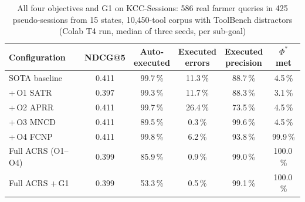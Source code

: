 \begin{table}[htbp]
  \centering
  \caption{All four objectives and G1 on KCC-Sessions: 586 real farmer queries in 425 pseudo-sessions from 15 states, 10{,}450-tool corpus with ToolBench distractors (Colab T4 run, median of three seeds, per sub-goal)}
  \label{tab:gkcc-ablation}
  \footnotesize\setlength{\tabcolsep}{4pt}
  \begin{tabular}{@{}lccccc@{}}
    \toprule
    Configuration & NDCG@5 & \makecell{Auto-\\executed} & \makecell{Executed\\errors} & \makecell{Executed\\precision} & \makecell{$\Phi^\ast$\\met} \\
    \midrule
    SOTA baseline & 0.411 & 99.7\,\% & 11.3\,\% & 88.7\,\% & 4.5\,\% \\
    +\,O1 SATR & 0.397 & 99.3\,\% & 11.7\,\% & 88.3\,\% & 3.1\,\% \\
    +\,O2 APRR & 0.411 & 99.7\,\% & 26.4\,\% & 73.5\,\% & 4.5\,\% \\
    +\,O3 MNCD & 0.411 & 89.5\,\% & 0.3\,\% & 99.6\,\% & 4.5\,\% \\
    +\,O4 FCNP & 0.411 & 99.8\,\% & 6.2\,\% & 93.8\,\% & 99.9\,\% \\
    Full ACRS (O1--O4) & 0.399 & 85.9\,\% & 0.9\,\% & 99.0\,\% & 100.0\,\% \\
    Full ACRS +\,G1 & 0.399 & 53.3\,\% & 0.5\,\% & 99.1\,\% & 100.0\,\% \\
    \bottomrule
  \end{tabular}
\end{table}


